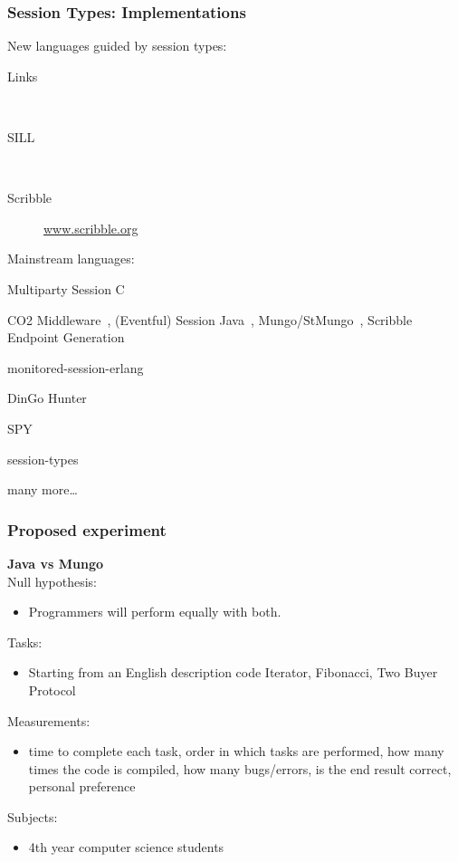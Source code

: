\begin{frame}\frametitle{Session Types: Implementations}
New languages guided by session types:
\begin{description}
\item [Links]~\cite{lindleylightweight}
\item [SILL]~\cite{pfenning2015}
\item [Scribble] \url{www.scribble.org}
\end{description}

Mainstream languages:
\begin{description}
\item [C] Multiparty Session C~\cite{ng12}
\item [Java] CO2 Middleware~\cite{Bartoletti2015}, (Eventful) Session Java~\cite{hu08}, Mungo/StMungo~\cite{kouzapas16}, Scribble Endpoint Generation~\cite{hu16}
\item [Erlang] monitored-session-erlang~\cite{fowler}
\item [Go] DinGo Hunter~\cite{dingo}
\item [Python] SPY~\cite{Neykova2013}
\item [Rust] session-types~\cite{rust}
\item many more\ldots
\end{description}

\end{frame}

\begin{frame}\frametitle{Proposed experiment}
  \textbf{Java vs Mungo}\\
  Null hypothesis:
\begin{itemize}
  \item Programmers will perform equally with both.\\
\end{itemize}


  Tasks:
  \begin{itemize}
    \item Starting from an English description code Iterator, Fibonacci, Two Buyer Protocol\\
  \end{itemize}

  Measurements:
  \begin{itemize}
    \item time to complete each task, order in which tasks are performed, how many times the code is compiled, how many bugs/errors, is the end result correct, personal preference\\
  \end{itemize}

  Subjects:
\begin{itemize}
  \item   4th year computer science students\\
\end{itemize}
\end{frame}
